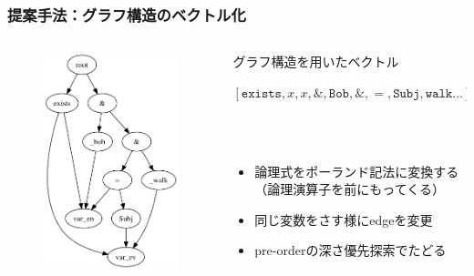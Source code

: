 \documentclass[dvipdfmx]{beamer}
\newcommand{\LF}[1]{\ensuremath{\texttt{#1}}}
\begin{document}
\begin{frame}
\frametitle{提案手法：グラフ構造のベクトル化}
\begin{columns}[t]
    \begin{column}{0.4\textwidth} %
        \begin{figure}[h]
        	\includegraphics[width=4cm]{graph.png}
                \label{fig:graph}
        \end{figure}
    \end{column}
    \begin{column}{0.6\textwidth} %
      \begin{block}{グラフ構造を用いたベクトル}
        \begin{center}
         $[\LF{exists},x,x,\&,\LF{Bob},\&,=,\LF{Subj},\LF{walk}...]$
         \end{center}
      \end{block}
      \\~\
      \begin{itemize}
        \item 論理式をポーランド記法に変換する\\（論理演算子を前にもってくる）
        \item 同じ変数をさす様にedgeを変更
        \item pre-orderの深さ優先探索でたどる
      \end{itemize}
    \end{column}
\end{columns}

\end{frame}
\end{document}
